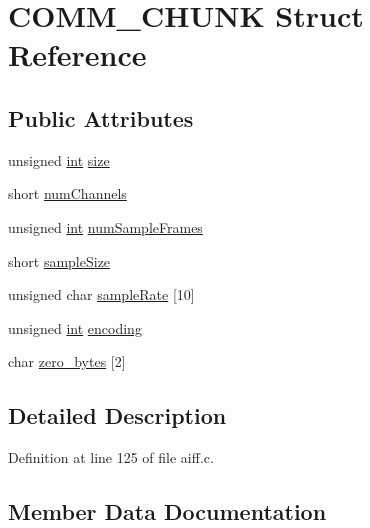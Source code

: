 \hypertarget{struct_c_o_m_m___c_h_u_n_k}{}\section{C\+O\+M\+M\+\_\+\+C\+H\+U\+NK Struct Reference}
\label{struct_c_o_m_m___c_h_u_n_k}
\subsection*{Public Attributes}
\begin{DoxyCompactItemize}
\item 
unsigned \hyperlink{xmltok_8h_a5a0d4a5641ce434f1d23533f2b2e6653}{int} \hyperlink{struct_c_o_m_m___c_h_u_n_k_abcec2de45f3418792a12c1acbb0cb8df}{size}
\item 
short \hyperlink{struct_c_o_m_m___c_h_u_n_k_a5a0e52025102d26f153200cdde0c1ed9}{num\+Channels}
\item 
unsigned \hyperlink{xmltok_8h_a5a0d4a5641ce434f1d23533f2b2e6653}{int} \hyperlink{struct_c_o_m_m___c_h_u_n_k_a23b9d6dd74ebf42bc9356ce8adf2640d}{num\+Sample\+Frames}
\item 
short \hyperlink{struct_c_o_m_m___c_h_u_n_k_ab4f385615253bec48f581c4d3963bb90}{sample\+Size}
\item 
unsigned char \hyperlink{struct_c_o_m_m___c_h_u_n_k_aa1b3c130ca9cea336fcaec57c864072b}{sample\+Rate} \mbox{[}10\mbox{]}
\item 
unsigned \hyperlink{xmltok_8h_a5a0d4a5641ce434f1d23533f2b2e6653}{int} \hyperlink{struct_c_o_m_m___c_h_u_n_k_a460b061c5e34eb1c5c04585b4fadd6fe}{encoding}
\item 
char \hyperlink{struct_c_o_m_m___c_h_u_n_k_a19b7fca0acce2bdd8edc5ee0814228ad}{zero\+\_\+bytes} \mbox{[}2\mbox{]}
\end{DoxyCompactItemize}


\subsection{Detailed Description}


Definition at line 125 of file aiff.\+c.



\subsection{Member Data Documentation}

